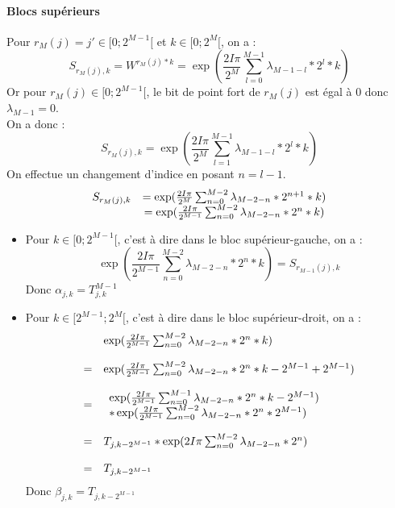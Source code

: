 \documentclass{report}
\begin{document}
			\paragraph{Blocs supérieurs}
			Pour $r_M(j) = j' \in [0; 2^{M-1}[$ et $k\in[0; 2^M[$, on a :
			\[
				S_{r_M(j),k} = W^{r_M(j) * k} = \exp({\frac{2I\pi}{2^M}} \sum_{l=0}^{M-1} \lambda_{M-1-l} * 2^l * k)
			\]
			Or pour $r_M(j)\in[0;2^{M-1}[$, le bit de point fort de $r_M(j)$ est égal à $0$ donc $\lambda_{M-1} = 0$.\\
			On a donc :
			\[
				S_{r_M(j),k} = \exp({\frac{2I\pi}{2^M}} \sum_{l=1}^{M-1} \lambda_{M-1-l} * 2^l * k)
			\]
			On effectue un changement d'indice en posant $n = l-1$.
			\[
			\begin{array}{l c}
				S_{r_M(j),k} 	&= \exp({\frac{2I\pi}{2^M}} \sum_{n=0}^{M-2} \lambda_{M-2-n} * 2^{n+1} * k) \\
								&= \exp({\frac{2I\pi}{2^{M-1}}} \sum_{n=0}^{M-2} \lambda_{M-2-n} * 2^{n} * k)
			\end{array}
			\]

			\begin{itemize}
				\item Pour $k\in[0; 2^{M-1}[$, c'est à dire dans le bloc supérieur-gauche, on a :\\
				\[
					\exp({\frac{2I\pi}{2^{M-1}}} \sum_{n=0}^{M-2} \lambda_{M-2-n} * 2^{n} * k) = S_{r_{M-1}(j),k}
				\]
				Donc $\boxed{\alpha_{j,k} = T_{j,k}^{M-1}}$

				\item Pour $k\in[2^{M-1}; 2^M[$, c'est à dire dans le bloc supérieur-droit, on a :\\
				\[
				\begin{array}{r l}
						&	\exp({\frac{2I\pi}{2^{M-1}}} \sum_{n=0}^{M-2} \lambda_{M-2-n} * 2^{n} * k) \\
						&	\\

					= 	&	\exp({\frac{2I\pi}{2^{M-1}}} \sum_{n=0}^{M-2} \lambda_{M-2-n} * 2^{n} * k - 2^{M-1} + 2^{M-1}) \\
						&	\\

					= 	&	\begin{array}{l}
								\exp({\frac{2I\pi}{2^{M-1}}} \sum_{n=0}^{M-1} \lambda_{M-2-n} * 2^{n} * k - 2^{M-1})\\
								* \exp({\frac{2I\pi}{2^{M-1}}} \sum_{n=0}^{M-2} \lambda_{M-2-n} * 2^{n} * 2^{M-1}) 
							\end{array} \\
						&	\\

					= 	&	T_{j,k-2^{M-1}} * \exp({2I\pi} \sum_{n=0}^{M-2} \lambda_{M-2-n} * 2^{n}) \\
						&	\\

					=	&	T_{j,k-2^{M-1}}
				\end{array}
				\]
				Donc $\boxed{\beta_{j,k} = T_{j,k-2^{M-1}}}$
			\end{itemize}
\end{document}
